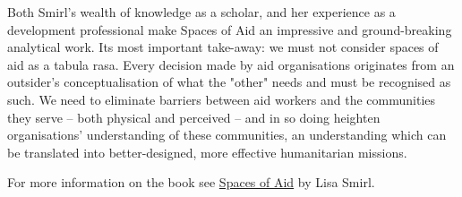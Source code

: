    Both Smirl's wealth of knowledge as a scholar, and her experience as a
   development professional make Spaces of Aid an impressive and
   ground-breaking analytical work. Its most important take-away: we must
   not consider spaces of aid as a tabula rasa. Every decision made by aid
   organisations originates from an outsider's conceptualisation of what
   the "other" needs and must be recognised as such. We need to eliminate
   barriers between aid workers and the communities they serve -- both
   physical and perceived -- and in so doing heighten organisations'
   understanding of these communities, an understanding which can be
   translated into better-designed, more effective humanitarian missions.

   For more information on the book see \href{https://www.goodreads.com/book/show/23258385-spaces-of-aid}{Spaces of Aid} by Lisa Smirl.

